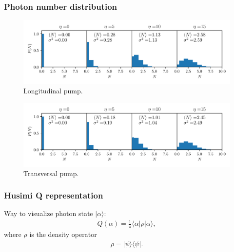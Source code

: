 \documentclass[pdflatex,compress]{beamer}
\begin{document}
\begin{frame}
\frametitle{Photon number distribution}
\vspace{-1em}
\begin{figure}
\centering
\includegraphics[width=.9\textwidth]{images/pho_dens_long.pdf}
\vspace*{-6mm}
\caption{Longitudinal pump.}
\end{figure}
\vspace{-2em}
\begin{figure}
\centering
\includegraphics[width=.9\textwidth]{images/pho_dens_trans.pdf}
\vspace*{-6mm}
\caption{Transversal pump.}
\end{figure}
\end{frame}

\begin{frame}
\frametitle{Husimi Q representation}
Way to visualize photon state $|\alpha \rangle$:
\begin{align}
Q(\alpha) = \frac{1}{\pi} \langle \alpha | \rho | \alpha \rangle,
\end{align}where $\rho$ is the density operator
\begin{align}
\rho = |\psi \rangle \langle \psi |.
\end{align}
\end{frame}
\end{document}
